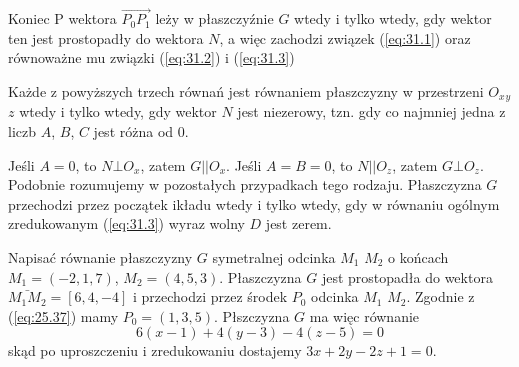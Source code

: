 \begin{dowod}
Koniec P wektora $\stackrel{\rightarrow}{P_0P_1}$ leży w płaszczyźnie $G$ wtedy i tylko wtedy, gdy wektor ten jest prostopadły do wektora $N$, a więc zachodzi związek (\ref{eq:31.1}) oraz równoważne mu związki (\ref{eq:31.2}) i (\ref{eq:31.3})
\end{dowod}
\begin{uwaga}{1}
Każde z powyższych trzech równań jest równaniem płaszczyzny w przestrzeni $O_x$$_y$$z$ wtedy i tylko wtedy, gdy wektor $N$ jest niezerowy, tzn. gdy co najmniej jedna z liczb $A$, $B$, $C$ jest różna od $0$.
\end{uwaga}

\begin{przypadki}
Jeśli $A=0$, to $N \bot O_x$, zatem $G||O_x$. Jeśli $A=B=0$, to $N||O_z$, zatem $G \bot O_z$. Podobnie rozumujemy w pozostałych przypadkach tego rodzaju. Płaszczyzna $G$ przechodzi przez początek ikładu wtedy i tylko wtedy, gdy w równaniu ogólnym zredukowanym (\ref{eq:31.3}) wyraz wolny $D$ jest zerem.
\end{przypadki}

\begin{przyklad}{31.1}
Napisać równanie płaszczyzny $G$ symetralnej odcinka $M_1$ $M_2$ o końcach $M_1=(-2, 1, 7)$, $M_2=(4, 5, 3)$.
Płaszczyzna $G$ jest prostopadła do wektora $\bar{M_1M_2}=[6, 4, -4]$ i przechodzi przez środek $P_0$ odcinka $M_1$ $M_2$. Zgodnie z (\ref{eq:25.37}) mamy $P_0=(1,3,5)$. Płszczyzna $G$ ma więc równanie
\begin{equation}
	6(x - 1) + 4(y - 3) - 4(z - 5) = 0 \nonumber
\end{equation}
skąd po uproszczeniu i zredukowaniu dostajemy $3x+2y-2z+1=0$.
\end{przyklad}

